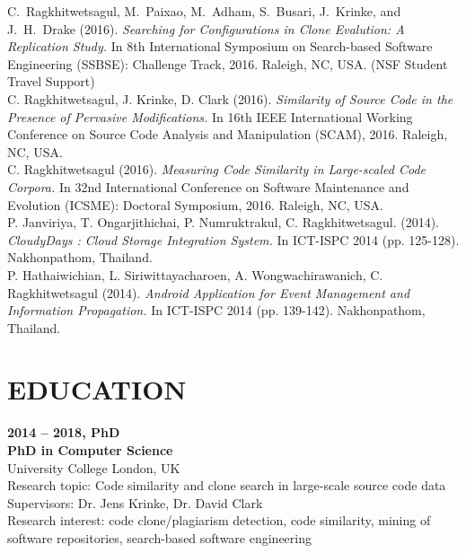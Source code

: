 \documentclass[margin, 10pt]{res} %
\begin{document}
\begin{resume}
C.~Ragkhitwetsagul, M.~Paixao, M.~Adham, S.~Busari, J.~Krinke, and J.~H.~Drake (2016). \textit{Searching for Configurations in Clone Evalution: A Replication Study.} In 8th International Symposium on Search-based Software Engineering (SSBSE): Challenge Track, 2016. Raleigh, NC, USA. (NSF Student Travel Support) \vspace{2mm} \\
C. Ragkhitwetsagul, J. Krinke, D. Clark (2016). \textit{Similarity of Source Code in the Presence of Pervasive Modifications.} In 16th IEEE International Working Conference on Source Code Analysis and Manipulation (SCAM), 2016. Raleigh, NC, USA. \vspace{2mm} \\
C. Ragkhitwetsagul (2016). \textit{Measuring Code Similarity in Large-scaled Code Corpora.} In 32nd International Conference on Software Maintenance and Evolution (ICSME): Doctoral Symposium, 2016. Raleigh, NC, USA. \vspace{2mm} \\
\newpage
P. Janviriya, T. Ongarjithichai, P. Numruktrakul, C. Ragkhitwetsagul. (2014). \textit{CloudyDays : Cloud Storage Integration System.} In ICT-ISPC 2014 (pp. 125-128). Nakhonpathom, Thailand. \vspace{2mm} \\
P. Hathaiwichian, L. Siriwittayacharoen, A. Wongwachirawanich, C. Ragkhitwetsagul (2014). \textit{Android Application for Event Management and Information Propagation.} In ICT-ISPC 2014 (pp. 139-142). Nakhonpathom, Thailand.


\section{EDUCATION}
\textbf{2014 -- 2018, PhD}\\
\textbf{PhD in Computer Science}\\
University College London, UK\\
Research topic:  Code similarity and clone search in large-scale source code data \\
Supervisors: Dr. Jens Krinke, Dr. David Clark\\
Research interest: code clone/plagiarism detection, code similarity, mining of software repositories, search-based software engineering 


\end{resume}
\end{document}
